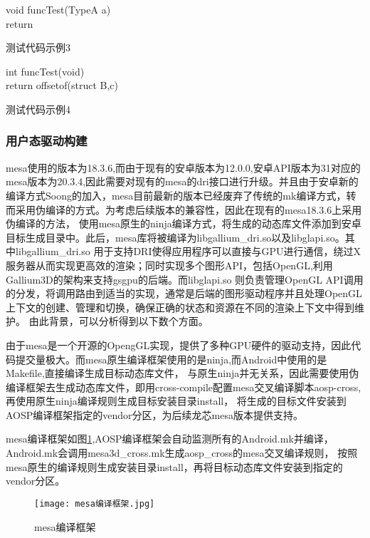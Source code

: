 \begin{minipage}{0.45\textwidth}
  \begin{algorithm}[H]
    \SetAlgoLined
    void funcTest(TypeA a){\\
      return \;
    }
    \caption{测试代码示例3}
    \label{algo:algorithm4}
  \end{algorithm}
\end{minipage}
\hfill
\begin{minipage}{0.45\textwidth}
  \begin{algorithm}[H]
    \SetAlgoLined
    int funcTest(void){\\
      return offsetof(struct B,c) \;
    }
    \caption{测试代码示例4}
    \label{algo:algorithm5}
  \end{algorithm}
\end{minipage}

\subsubsection{用户态驱动构建}

mesa使用的版本为18.3.6,而由于现有的安卓版本为12.0.0,安卓API版本为31对应的mesa版本为20.3.4,因此需要对现有的mesa的dri接口进行升级。并且由于安卓新的
编译方式Soong的加入，mesa目前最新的版本已经废弃了传统的mk编译方式，转而采用伪编译的方式。为考虑后续版本的兼容性，因此在现有的mesa18.3.6上采用伪编译的方法，
使用mesa原生的ninja编译方式，将生成的动态库文件添加到安卓目标生成目录中。此后，mesa库将被编译为libgallium\_dri.so以及libglapi.so。其中libgallium\_dri.so
用于支持DRI使得应用程序可以直接与GPU进行通信，绕过X服务器从而实现更高效的渲染；同时实现多个图形API，包括OpenGL,利用Gallium3D的架构来支持gsgpu的后端。而libglapi.so
则负责管理OpenGL API调用的分发，将调用路由到适当的实现，通常是后端的图形驱动程序并且处理OpenGL上下文的创建、管理和切换，确保正确的状态和资源在不同的渲染上下文中得到维护。
由此背景，可以分析得到以下数个方面。

由于mesa是一个开源的OpengGL实现，提供了多种GPU硬件的驱动支持，因此代码提交量极大。而mesa原生编译框架使用的是ninja,而Android中使用的是Makefile,直接编译生成目标动态库文件，
与原生ninja并无关系，因此需要使用伪编译框架去生成动态库文件，即用cross-compile配置mesa交叉编译脚本aosp-cross,再使用原生ninja编译规则生成目标安装目录install，
将生成的目标文件安装到AOSP编译框架指定的vendor分区，为后续龙芯mesa版本提供支持。

mesa编译框架如图\ref{fig:mesa编译框架},AOSP编译框架会自动监测所有的Android.mk并编译，Android.mk会调用mesa3d\_cross.mk生成aosp\_cross的mesa交叉编译规则，
按照mesa原生的编译规则生成安装目录install，再将目标动态库文件安装到指定的vendor分区。
\begin{figure}[h]
  \centering
  \texttt{[image: mesa编译框架.jpg]}
  \caption{mesa编译框架}
  \label{fig:mesa编译框架}
\end{figure}

